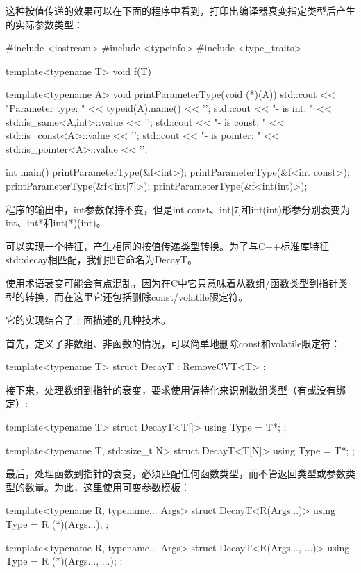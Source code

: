 这种按值传递的效果可以在下面的程序中看到，打印出编译器衰变指定类型后产生的实际参数类型：

\begin{cpp}
#include <iostream>
#include <typeinfo>
#include <type_traits>

template<typename T>
void f(T)
{ }

template<typename A>
void printParameterType(void (*)(A))
{
	std::cout << "Parameter type: " << typeid(A).name() << '\n';
	std::cout << "- is int: " << std::is_same<A,int>::value << '\n';
	std::cout << "- is const: " << std::is_const<A>::value << '\n';
	std::cout << "- is pointer: " << std::is_pointer<A>::value << '\n';
}

int main()
{
	printParameterType(&f<int>);
	printParameterType(&f<int const>);
	printParameterType(&f<int[7]>);
	printParameterType(&f<int(int)>);
}
\end{cpp}

程序的输出中，int参数保持不变，但是int const、int[7]和int(int)形参分别衰变为int、int*和int(*)(int)。

可以实现一个特征，产生相同的按值传递类型转换。为了与C++标准库特征std::decay相匹配，我们把它命名为DecayT。

\begin{notice}
使用术语衰变可能会有点混乱，因为在C中它只意味着从数组/函数类型到指针类型的转换，而在这里它还包括删除const/volatile限定符。
\end{notice}

它的实现结合了上面描述的几种技术。

首先，定义了非数组、非函数的情况，可以简单地删除const和volatile限定符：

\begin{cpp}
template<typename T>
struct DecayT : RemoveCVT<T> {
};
\end{cpp}

接下来，处理数组到指针的衰变，要求使用偏特化来识别数组类型（有或没有绑定）:

\begin{cpp}
template<typename T>
struct DecayT<T[]> {
	using Type = T*;
};

template<typename T, std::size_t N>
struct DecayT<T[N]> {
	using Type = T*;
};
\end{cpp}

最后，处理函数到指针的衰变，必须匹配任何函数类型，而不管返回类型或参数类型的数量。为此，这里使用可变参数模板：

\begin{cpp}
template<typename R, typename... Args>
struct DecayT<R(Args...)> {
	using Type = R (*)(Args...);
};

template<typename R, typename... Args>
struct DecayT<R(Args..., ...)> {
	using Type = R (*)(Args..., ...);
};
\end{cpp}

